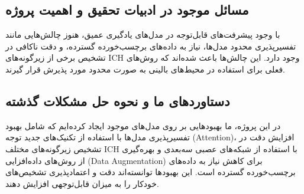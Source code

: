 \subsection*{مسائل موجود در ادبیات تحقیق و اهمیت پروژه}

با وجود پیشرفت‌های قابل‌توجه در مدل‌های یادگیری عمیق، هنوز چالش‌هایی مانند تفسیرپذیری محدود مدل‌ها، نیاز به داده‌های برچسب‌خورده گسترده، و دقت ناکافی در تشخیص برخی از زیرگونه‌های ICH وجود دارد. این چالش‌ها باعث شده‌اند که روش‌های فعلی برای استفاده در محیط‌های بالینی به صورت محدود مورد پذیرش قرار گیرند.

\subsection*{دستاوردهای ما و نحوه حل مشکلات گذشته}

در این پروژه، ما بهبودهایی بر روی مدل‌های موجود ایجاد کرده‌ایم که شامل بهبود تفسیرپذیری مدل‌ها با استفاده از تکنیک‌های جدید توجه (Attention)، افزایش دقت در تشخیص زیرگونه‌های مختلف ICH با استفاده از شبکه‌های عصبی سه‌بعدی و بهره‌گیری از روش‌های داده‌افزایی (Data Augmentation) برای کاهش نیاز به داده‌های برچسب‌خورده گسترده است. این بهبودها توانسته‌اند دقت و اعتمادپذیری تشخیص‌های خودکار را به میزان قابل‌توجهی افزایش دهند.
